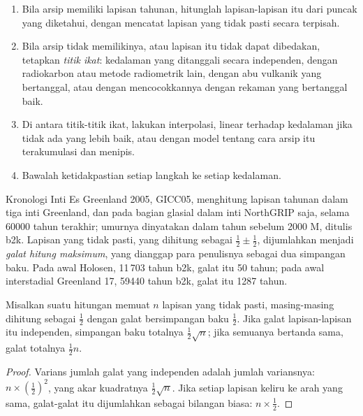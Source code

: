 \begin{method}\label{met:b2:climate-proxies:age-model}
\begin{enumerate}
  \item Bila arsip memiliki lapisan tahunan, hitunglah lapisan-lapisan itu dari puncak yang diketahui, dengan mencatat lapisan yang tidak pasti
        secara terpisah.
  \item Bila arsip tidak memilikinya, atau lapisan itu tidak dapat dibedakan, tetapkan \emph{titik ikat}: kedalaman yang ditanggali
        secara independen, dengan radiokarbon atau metode radiometrik lain, dengan abu vulkanik yang bertanggal, atau dengan
        mencocokkannya dengan rekaman yang bertanggal baik.
  \item Di antara titik-titik ikat, lakukan interpolasi, linear terhadap kedalaman jika tidak ada yang lebih baik, atau dengan
        model tentang cara arsip itu terakumulasi dan menipis.
  \item Bawalah ketidakpastian setiap langkah ke setiap kedalaman.
\end{enumerate}
\end{method}

Kronologi Inti Es Greenland 2005, GICC05, menghitung lapisan tahunan dalam tiga inti Greenland, dan
pada bagian glasial dalam inti NorthGRIP saja, selama \num{60000} tahun terakhir; umurnya
dinyatakan dalam tahun sebelum 2000 M, ditulis b2k. Lapisan yang tidak pasti, yang dihitung sebagai $\frac12 \pm \frac12$,
dijumlahkan menjadi \emph{galat hitung maksimum}, yang dianggap para penulisnya sebagai dua simpangan baku.
Pada awal Holosen, 11\,703 tahun b2k, galat itu 50 tahun; pada awal
interstadial Greenland 17, \num{59440} tahun b2k, galat itu \num{1287} tahun.

\begin{proposition}\label{prop:b2:climate-proxies:counting}
Misalkan suatu hitungan memuat $n$ lapisan yang tidak pasti, masing-masing dihitung sebagai $\frac12$ dengan galat bersimpangan
baku $\frac12$. Jika galat lapisan-lapisan itu independen, simpangan baku
totalnya $\frac12\sqrt{n}$; jika semuanya bertanda sama, galat totalnya
$\frac12 n$.
\end{proposition}

\begin{proof}
Varians jumlah galat yang independen adalah jumlah variansnya: $n \times
(\frac12)^2$, yang akar kuadratnya $\frac12\sqrt{n}$. Jika setiap lapisan keliru ke arah yang sama,
galat-galat itu dijumlahkan sebagai bilangan biasa: $n \times \frac12$.
\end{proof}

